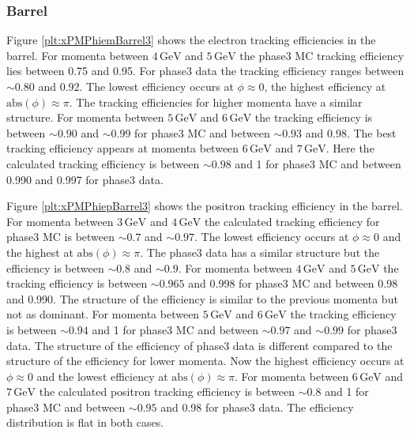 \documentclass[a4paper,11pt,twosided,final,german,openbib,pdftex,listof=totoc,bibliography=totoc]{scrbook}
\begin{document}
\newpage
\subsubsection{Barrel}

Figure \ref{plt:xPMPhiemBarrel3} shows the electron tracking efficiencies in the barrel.
For momenta between $4\,\textrm{GeV}$ and $5\,\textrm{GeV}$ the phase3 MC tracking efficiency lies between 0.75 and 0.95. For phase3 data the tracking efficiency ranges between $ \sim 0.80$ and 0.92. The lowest efficiency occurs at $\phi \approx 0$, the highest efficiency at $\textrm{abs}(\phi) \approx \pi$.
The tracking efficiencies for higher momenta have a similar structure. 
For momenta between $5\,\textrm{GeV}$ and $6\,\textrm{GeV}$ the tracking efficiency is between $\sim 0.90$ and $\sim 0.99$ for phase3 MC and between $\sim 0.93$ and 0.98. The best tracking efficiency appears at momenta between $6\,\textrm{GeV}$ and $7\,\textrm{GeV}$. Here the calculated tracking efficiency is between $\sim 0.98$ and 1 for phase3 MC and between 0.990 and 0.997 for phase3 data.

Figure \ref{plt:xPMPhiepBarrel3} shows the positron tracking efficiency in the barrel. 
For momenta between $3\,\textrm{GeV}$ and $4\,\textrm{GeV}$ the calculated tracking efficiency for phase3 MC is between $\sim 0.7$ and $\sim 0.97$. The lowest efficiency  occurs at $\phi \approx 0$ and the highest at $\textrm{abs}(\phi) \approx \pi$. The phase3 data has a similar structure but the efficiency is between $\sim 0.8$ and $\sim 0.9$.
For momenta between $4\,\textrm{GeV}$ and $5\,\textrm{GeV}$ the tracking efficiency is between $\sim 0.965$ and 0.998 for phase3 MC and between 0.98 and 0.990. The structure of the efficiency is similar to the previous momenta but not as dominant.
For momenta between $5\,\textrm{GeV}$ and $6\,\textrm{GeV}$ the tracking efficiency is between $\sim 0.94$ and 1 for phase3 MC and between $\sim 0.97$ and $\sim 0.99$ for phase3 data. The structure of the efficiency of phase3 data is different compared to the structure of the efficiency for lower momenta. Now the highest efficiency occurs at $\phi \approx 0$ and the lowest efficiency at $\textrm{abs}{(\phi)} \approx \pi$.
For momenta between $6\,\textrm{GeV}$ and $7\,\textrm{GeV}$ the calculated positron tracking efficiency is  between $\sim 0.8$ and 1 for phase3 MC and between $\sim 0.95$ and 0.98 for phase3 data. The efficiency distribution is flat in both cases.
\end{document}
